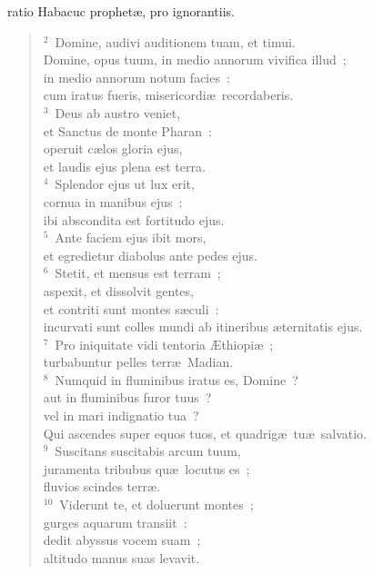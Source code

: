 \bchapter
{}ratio Habacuc prophet\ae , pro ignorantiis.


\begin{flushleft}\begin{verse}\vspace{6pt}${}^{2}$~Domine, audivi auditionem tuam, et timui.\\ Domine, opus tuum, in medio annorum vivifica illud~;\\ in medio annorum notum facies~:\\ cum iratus fueris, misericordi\ae\ recordaberis.\\
${}^{3}$~Deus ab austro veniet,\\ et Sanctus de monte Pharan~:\\ operuit c\ae los gloria ejus,\\ et laudis ejus plena est terra.\\
${}^{4}$~Splendor ejus ut lux erit,\\ cornua in manibus ejus~:\\ ibi abscondita est fortitudo ejus.\\
${}^{5}$~Ante faciem ejus ibit mors,\\ et egredietur diabolus ante pedes ejus.\\
${}^{6}$~Stetit, et mensus est terram~;\\ aspexit, et dissolvit gentes,\\ et contriti sunt montes s\ae culi~:\\ incurvati sunt colles mundi ab itineribus \ae ternitatis ejus.\\
${}^{7}$~Pro iniquitate vidi tentoria \AE thiopi\ae~;\\ turbabuntur pelles terr\ae\ Madian.\\
${}^{8}$~Numquid in fluminibus iratus es, Domine~?\\ aut in fluminibus furor tuus~?\\ vel in mari indignatio tua~?\\ Qui ascendes super equos tuos, et quadrig\ae\ tu\ae\ salvatio.\\
${}^{9}$~Suscitans suscitabis arcum tuum,\\ juramenta tribubus qu\ae\ locutus es~;\\ fluvios scindes terr\ae .\\
${}^{10}$~Viderunt te, et doluerunt montes~;\\ gurges aquarum transiit~:\\ dedit abyssus vocem suam~;\\ altitudo manus suas levavit.\\

\end{verse}
\end{flushleft}
